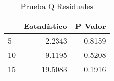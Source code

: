 \begin{table}[H]
\label{tab:q_test_resid}
\centering
\begin{tabular}{lrr}
\toprule
 & Estad\'istico & P-Valor \\
\midrule
5 & 2.2343 & 0.8159 \\
10 & 9.1195 & 0.5208 \\
15 & 19.5083 & 0.1916 \\
\bottomrule
\end{tabular}
\caption{Prueba Q Residuales}
\end{table}
